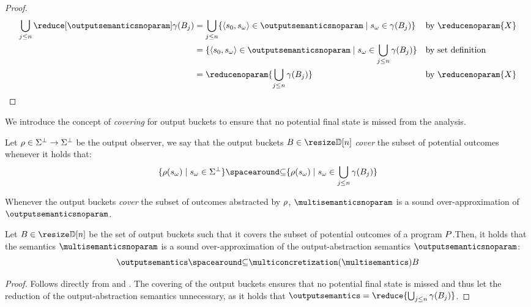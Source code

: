 \begin{proof}
\begin{align*}
    \bigsetjoin_{j\le n}\reducedoutputsemanticsnoparam &= \bigsetjoin_{j\le n} \setdef{\inputoutputtuple{\defstate}\in\outputsemanticsnoparam}{\retrieveoutput{\defstate}\in\abstractdomainconcretization(\bucket)}
      && \text{by $\reducenoparam{X}$} \\
    &= \setdef{\inputoutputtuple{\defstate}\in\outputsemanticsnoparam}{\retrieveoutput{\defstate}\in\bigsetjoin_{j \le n}\abstractdomainconcretization(\bucket)}
      && \text{by set definition} \\
    &= \reducenoparam{\bigsetjoin_{j \le n}\abstractdomainconcretization(\bucket)}
      && \text{by $\reducenoparam{X}$}
  \end{align*}
  \end{proof}

We introduce the concept of \emph{covering} for output buckets to ensure that no potential final state is missed from the analysis.

\begin{definition}[Covering]\label{def:covering}
  Let $\rho\in\Sigma^\bot\to\Sigma^\bot$ be the output observer, we say that the output buckets $\buckets\in\vectorbuckets$ \textit{cover} the subset of potential outcomes whenever it holds that:
  \[
    \setdef{\outputobs(\retrieveoutput\defstate)}{\retrieveoutput{\defstate} \in \stateandbottom} \SubseteQ \setdef{\outputobs(\retrieveoutput\defstate)}{\retrieveoutput\defstate\in\bigsetjoin_{j\le n}\abstractdomainconcretization(\bucket)}
  \]
\end{definition}


Whenever the output buckets \textit{cover} the subset of outcomes abstracted by $\rho$, $\multisemanticsnoparam$ is a sound over-approximation of $\outputsemanticsnoparam$.

\begin{lemma}
  Let $\buckets\in\vectorbuckets$ be the set of output buckets such that it covers the subset of potential outcomes of a program $P$.Then, it holds that the semantics $\multisemanticsnoparam$ is a \textup{sound over-approximation} of the output-abstraction semantics $\outputsemanticsnoparam$:
  \[
    \outputsemantics \SubseteQ \multiconcretization(\multisemantics)\buckets
  \]
\end{lemma}
\begin{proof}
  Follows directly from  and . The covering of the output buckets ensures that no potential final state is missed and thus let the reduction of the output-abstraction semantics unnecessary, as it holds that $\outputsemantics = \reduce{\bigsetjoin_{j\le n}\abstractdomainconcretization(\bucket)}$.
\end{proof}



